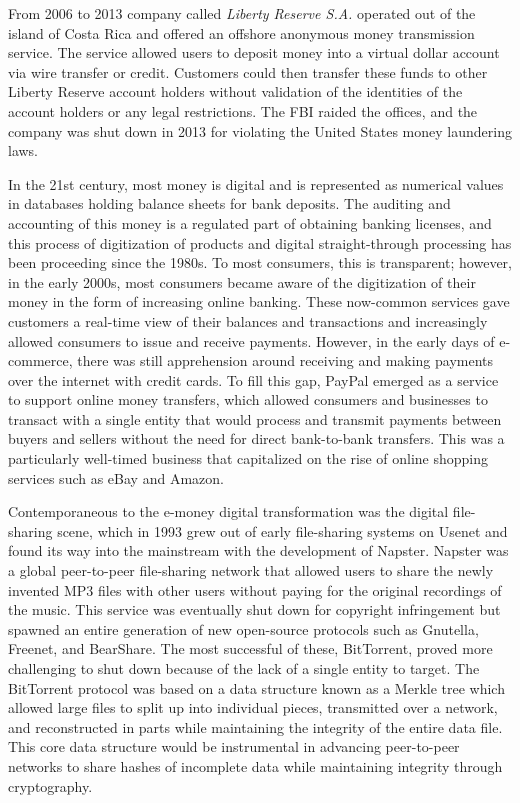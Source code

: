 
From 2006 to 2013 company called \textit{Liberty Reserve S.A.} operated out of
the island of Costa Rica and offered an offshore anonymous money transmission
service. The service allowed users to deposit money into a virtual dollar
account via wire transfer or credit. Customers could then transfer these funds
to other Liberty Reserve account holders without validation of the identities of
the account holders or any legal restrictions. The FBI raided the offices, and
the company was shut down in 2013 for violating the United States money
laundering laws.


In the 21st century, most money is digital and is represented as numerical
values in databases holding balance sheets for bank deposits. The auditing and
accounting of this money is a regulated part of obtaining banking licenses, and
this process of digitization of products and digital straight-through processing
has been proceeding since the 1980s. To most consumers, this is transparent;
however, in the early 2000s, most consumers became aware of the digitization of
their money in the form of increasing online banking. These now-common services
gave customers a real-time view of their balances and transactions and
increasingly allowed consumers to issue and receive payments. However, in the
early days of e-commerce, there was still apprehension around receiving and
making payments over the internet with credit cards. To fill this gap, PayPal
emerged as a service to support online money transfers, which allowed consumers
and businesses to transact with a single entity that would process and transmit
payments between buyers and sellers without the need for direct bank-to-bank
transfers. This was a particularly well-timed business that capitalized on the
rise of online shopping services such as eBay and Amazon.


Contemporaneous to the e-money digital transformation was the digital
file-sharing scene, which in 1993 grew out of early file-sharing systems on
Usenet and found its way into the mainstream with the development of  Napster.
Napster was a global peer-to-peer file-sharing network that allowed users to
share the newly invented MP3 files with other users without paying for the
original recordings of the music. This service was eventually shut down for
copyright infringement but spawned an entire generation of new open-source
protocols such as Gnutella, Freenet, and BearShare. The most successful of
these, BitTorrent, proved more challenging to shut down because of the lack of a
single entity to target. The BitTorrent protocol was based on a data structure
known as a Merkle tree which allowed large files to split up into individual
pieces, transmitted over a network, and reconstructed in parts while maintaining
the integrity of the entire data file. This core data structure would be
instrumental in advancing peer-to-peer networks to share hashes of incomplete
data while maintaining integrity through cryptography.

